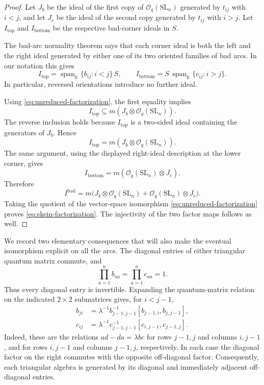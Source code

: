\documentclass[11pt]{amsart}
\theoremstyle{remark}
\newcommand{\kk}{\mathbb{K}}
\newcommand{\OO}{\mathcal O_q(\mathrm{SL}_n)}
\DeclareMathOperator{\Span}{span}
\begin{document}
\begin{proof}

Let $J_b$ be the ideal of the first copy of $\OO$ generated by
$t_{ij}$ with $i<j$, and let $J_c$ be the ideal of the second copy
generated by $t_{ij}$ with $i>j$.
Let $I_{\mathrm{top}}$ and $I_{\mathrm{bottom}}$ be the respective
bad-corner ideals in $S$.

The bad-arc normality theorem
\cite[Theorem~7.2, especially Equation~(128)]{LY} says that each
corner ideal is both the left and the right ideal generated by
either one of its two oriented families of bad arcs.  In our
notation this gives
\[
 I_{\mathrm{top}}
   =\Span_\kk\{b_{ij}:i<j\}\,S,
 \qquad
 I_{\mathrm{bottom}}
   =S\,\Span_\kk\{c_{ij}:i>j\}.
\]
In particular, reversed orientations introduce no further ideal.


Using \eqref{eq:unreduced-factorization}, the first equality implies
\[
 I_{\mathrm{top}}\subseteq m(J_b\otimes\OO).
\]
The reverse inclusion holds because $I_{\mathrm{top}}$ is a
two-sided ideal containing the generators of $J_b$.  Hence
\[
 I_{\mathrm{top}}=m(J_b\otimes\OO).
\]
The same argument, using the displayed right-ideal description at
the lower corner, gives
\[
 I_{\mathrm{bottom}}=m(\OO\otimes J_c).
\]
Therefore
\[
 I^{\mathrm{bad}}
   =m\bigl(J_b\otimes\OO+\OO\otimes J_c\bigr).
\]
Taking the quotient of the vector-space isomorphism
\eqref{eq:unreduced-factorization} proves
\eqref{eq:skein-factorization}.  The injectivity of the two factor
maps follows as well.
\end{proof}

We record two elementary consequences that will also make the
eventual isomorphism explicit on all the arcs.  The diagonal
entries of either triangular quantum matrix commute, and
\begin{equation}\label{eq:diagonal-units}
 \prod_{a=1}^n b_{aa}=\prod_{a=1}^n c_{aa}=1.
\end{equation}
Thus every diagonal entry is invertible.  Expanding the
quantum-matrix relation on the indicated $2\times2$ submatrices
gives, for $i<j-1$,
\begin{align}
 b_{ji}
 &=\lambda^{-1}b_{j-1,j-1}^{-1}
     [b_{j-1,i},b_{j,j-1}],
 \label{eq:lower-recursion}\\
 c_{ij}
 &=\lambda^{-1}c_{j-1,j-1}^{-1}
     [c_{i,j-1},c_{j-1,j}].
 \label{eq:upper-recursion}
\end{align}
Indeed, these are the relations $ad-da=\lambda bc$ for rows
$j-1,j$ and columns $i,j-1$, and for rows $i,j-1$ and columns
$j-1,j$, respectively.  In each case the diagonal factor on the
right commutes with the opposite off-diagonal factor.
Consequently, each triangular algebra is generated by its diagonal
and immediately adjacent off-diagonal entries.
\end{document}
